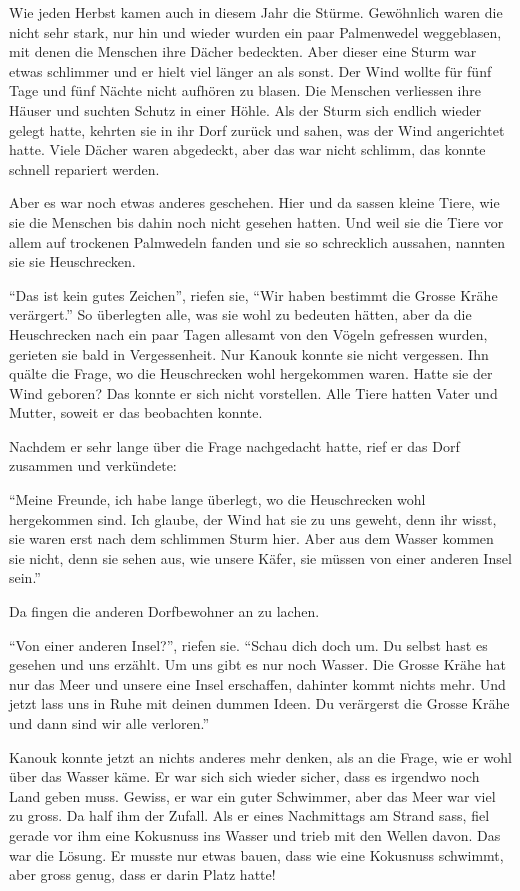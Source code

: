 Wie jeden Herbst kamen auch in diesem Jahr die Stürme. Gewöhnlich waren die
nicht sehr stark, nur hin und wieder wurden ein paar Palmenwedel weggeblasen,
mit denen die Menschen ihre Dächer bedeckten. Aber dieser eine Sturm war etwas schlimmer und er hielt viel länger an als sonst. Der Wind wollte für fünf Tage und fünf Nächte nicht aufhören zu blasen. Die Menschen verliessen ihre Häuser und suchten Schutz in einer Höhle. Als der Sturm sich endlich wieder gelegt hatte, kehrten sie in ihr Dorf zurück und sahen, was der Wind angerichtet hatte. Viele Dächer waren abgedeckt, aber das war nicht schlimm, das konnte schnell repariert werden. 

Aber es war noch etwas anderes geschehen. Hier und da sassen kleine Tiere, wie sie die Menschen bis dahin noch nicht gesehen hatten. Und weil sie die Tiere vor allem auf trockenen Palmwedeln fanden und sie so schrecklich aussahen, nannten sie sie Heuschrecken. 

\enquote{Das ist kein gutes Zeichen}, riefen sie, \enquote{Wir haben bestimmt die Grosse Krähe verärgert.} So überlegten alle, was sie wohl zu bedeuten hätten, aber da die Heuschrecken nach ein paar Tagen allesamt von den Vögeln gefressen wurden, gerieten sie bald in Vergessenheit. Nur Kanouk konnte sie nicht vergessen. Ihn quälte die Frage, wo die Heuschrecken wohl hergekommen waren. Hatte sie der Wind geboren? Das konnte er sich nicht vorstellen. Alle Tiere hatten Vater und Mutter, soweit er das beobachten konnte. 

Nachdem er sehr lange über die Frage nachgedacht hatte, rief er das Dorf zusammen und verkündete:

\enquote{Meine Freunde, ich habe lange überlegt, wo die Heuschrecken wohl
hergekommen sind. Ich glaube, der Wind hat sie zu uns geweht, denn ihr wisst, sie waren erst nach dem schlimmen Sturm hier. Aber aus dem Wasser kommen sie nicht, denn sie sehen aus, wie unsere Käfer, sie müssen von einer anderen Insel sein.}

Da fingen die anderen Dorfbewohner an zu lachen.

\enquote{Von einer anderen Insel?}, riefen sie. \enquote{Schau dich doch um. Du selbst hast es gesehen und uns erzählt. Um uns gibt es nur noch Wasser. Die Grosse Krähe hat nur das Meer und unsere eine Insel erschaffen, dahinter kommt nichts mehr. Und jetzt lass uns in Ruhe mit deinen dummen Ideen. Du verärgerst die Grosse Krähe und dann sind wir alle verloren.}

Kanouk konnte jetzt an nichts anderes mehr denken, als an die Frage, wie er wohl über das Wasser käme. Er war sich sich wieder sicher, dass es irgendwo noch Land geben muss. Gewiss, er war ein guter Schwimmer, aber das Meer war viel zu gross. Da half ihm der Zufall. Als er eines Nachmittags am Strand sass, fiel gerade vor ihm eine Kokusnuss ins Wasser und trieb mit den Wellen davon. Das war die Lösung. Er musste nur etwas bauen, dass wie eine Kokusnuss schwimmt, aber gross genug, dass er darin Platz hatte!

